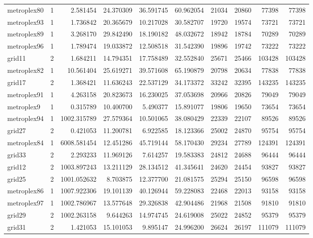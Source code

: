 \begin{longtable}{|l|r|r|r|r|r|r|r|r|r|}
metroplex80 & 1 & 2.581454 & 24.370309 & 36.591745 & 60.962054 & 21034 & 20860 & 77398 & 77398 \\
metroplex93 & 1 & 1.736842 & 20.365679 & 10.217028 & 30.582707 & 19720 & 19574 & 73721 & 73721 \\
metroplex89 & 1 & 3.268170 & 29.842490 & 18.190182 & 48.032672 & 18942 & 18784 & 70289 & 70289 \\
metroplex96 & 1 & 1.789474 & 19.033872 & 12.508518 & 31.542390 & 19896 & 19742 & 73222 & 73222 \\
grid11 & 2 & 1.684211 & 14.794351 & 17.758489 & 32.552840 & 25671 & 25466 & 103428 & 103428 \\
metroplex82 & 1 & 10.561404 & 25.619271 & 39.571608 & 65.190879 & 20798 & 20634 & 77838 & 77838 \\
grid17 & 2 & 1.368421 & 11.636243 & 22.537129 & 34.173372 & 33242 & 32395 & 143235 & 143235 \\
metroplex91 & 1 & 4.263158 & 20.823673 & 16.230025 & 37.053698 & 20966 & 20826 & 79049 & 79049 \\
metroplex9 & 1 & 0.315789 & 10.400700 & 5.490377 & 15.891077 & 19806 & 19650 & 73654 & 73654 \\
metroplex94 & 1 & 1002.315789 & 27.579364 & 10.501065 & 38.080429 & 22339 & 22107 & 89526 & 89526 \\
grid27 & 2 & 0.421053 & 11.200781 & 6.922585 & 18.123366 & 25002 & 24870 & 95754 & 95754 \\
metroplex84 & 1 & 6008.581454 & 12.451286 & 45.719144 & 58.170430 & 29234 & 27789 & 124391 & 124391 \\
grid33 & 2 & 2.293233 & 11.969126 & 7.614257 & 19.583383 & 24812 & 24688 & 96444 & 96444 \\
grid12 & 2 & 1003.897243 & 13.211129 & 28.134512 & 41.345641 & 24620 & 24454 & 93827 & 93827 \\
grid25 & 2 & 1001.052632 & 8.703875 & 12.377700 & 21.081575 & 25294 & 25150 & 96598 & 96598 \\
metroplex86 & 1 & 1007.922306 & 19.101139 & 40.126944 & 59.228083 & 22468 & 22013 & 93158 & 93158 \\
metroplex97 & 1 & 1002.786967 & 13.577648 & 29.326838 & 42.904486 & 21968 & 21508 & 91810 & 91810 \\
grid29 & 2 & 1002.263158 & 9.644263 & 14.974745 & 24.619008 & 25022 & 24852 & 95379 & 95379 \\
grid31 & 2 & 1.421053 & 15.101053 & 9.895147 & 24.996200 & 26624 & 26197 & 111079 & 111079 \\

\end{longtable}
